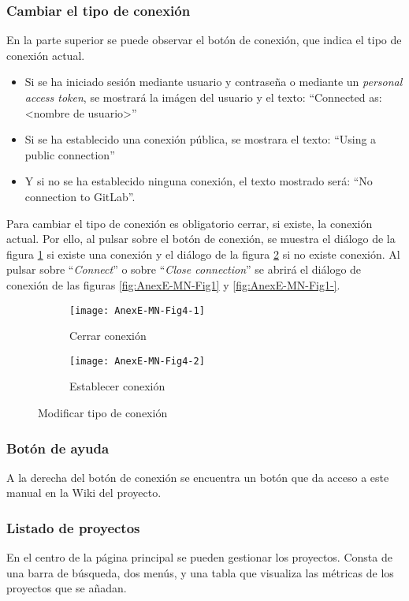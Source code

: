\subsubsection{Cambiar el tipo de conexión}
En la parte superior se puede observar el botón de conexión, que indica el tipo de conexión actual.
\begin{itemize}
	\tightlist
	\item Si se ha iniciado sesión mediante usuario y contraseña o mediante un \textit{personal access token}, se mostrará la imágen del usuario y el texto: ``Connected as: <nombre de usuario>''
	\item Si se ha establecido una conexión pública, se mostrara el texto: ``Using a public connection''
	\item Y si no se ha establecido ninguna conexión, el texto mostrado será: ``No connection to GitLab''.
\end{itemize}
Para cambiar el tipo de conexión es obligatorio cerrar, si existe, la conexión actual. Por ello, al pulsar sobre el botón de conexión, se muestra el diálogo de la figura \ref{fig:AnexE-MN-Fig4-1} si existe una conexión y el diálogo de la figura \ref{fig:AnexE-MN-Fig4-2} si no existe conexión. Al pulsar sobre ``\textit{Connect}'' o sobre ``\textit{Close connection}'' se abrirá el diálogo de conexión de las figuras \ref{fig:AnexE-MN-Fig1} y \ref{fig:AnexE-MN-Fig1-}.
\begin{figure}[!h]
	\centering
	\begin{subfigure}{.45\textwidth}
		\centering
		\texttt{[image: AnexE-MN-Fig4-1]}
		\caption{Cerrar conexión}
		\label{fig:AnexE-MN-Fig4-1}
	\end{subfigure}\hfill
	\begin{subfigure}{.45\textwidth}
		\centering
		\texttt{[image: AnexE-MN-Fig4-2]}
		\caption{Establecer conexión}
		\label{fig:AnexE-MN-Fig4-2}
	\end{subfigure}
	\caption{Modificar tipo de conexión}
	\label{fig:AnexE-MN-Fig4}
\end{figure}
\subsubsection{Botón de ayuda}
A la derecha del botón de conexión se encuentra un botón que da acceso a este manual en la Wiki del proyecto.
\subsubsection{Listado de proyectos}
En el centro de la página principal se pueden gestionar los proyectos. Consta de una barra de búsqueda, dos menús, y una tabla que visualiza las métricas de los proyectos que se añadan.

